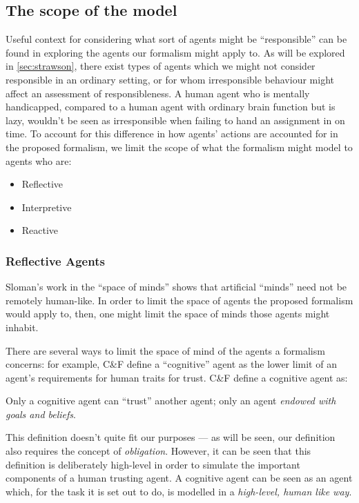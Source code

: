 \subsection{The scope of the model}\label{subsec:types-of-agents}
Useful context for considering what sort of agents might be ``responsible'' can be found in exploring the agents our formalism might apply to. As will be explored in \cref{sec:strawson}, there exist types of agents which we might not consider responsible in an ordinary setting, or for whom irresponsible behaviour might affect an assessment of responsibleness. A human agent who is mentally handicapped, compared to a human agent with ordinary brain function but is lazy, wouldn't be seen as irresponsible when failing to hand an assignment in on time. To account for this difference in how agents' actions are accounted for in the proposed formalism, we limit the scope of what the formalism might model to agents who are:\\
\begin{itemize}
    \item Reflective
    \item Interpretive
    \item Reactive
\end{itemize}

\subsubsection{Reflective Agents}
Sloman's work in the ``space of minds'' \cite{Sloman1984TheMinds} shows that artificial ``minds'' need not be remotely human-like. In order to limit the space of agents the proposed formalism would apply to, then, one might limit the space of minds those agents might inhabit.\par

There are several ways to limit the space of mind of the agents a formalism concerns: for example, C\&F define a ``cognitive'' agent as the lower limit of an agent's requirements for human traits for trust. C\&F define a cognitive agent as:
\begin{displayquote}
    Only a cognitive agent can ``trust'' another agent; only an agent \emph{endowed with goals and beliefs}.
\end{displayquote}\par

This definition doesn't quite fit our purposes --- as will be seen, our definition also requires the concept of \emph{obligation}. However, it can be seen that this definition is deliberately high-level in order to simulate the important components of a human trusting agent. A cognitive agent can be seen as an agent which, for the task it is set out to do, is modelled in a \emph{high-level, human like way}. \par

